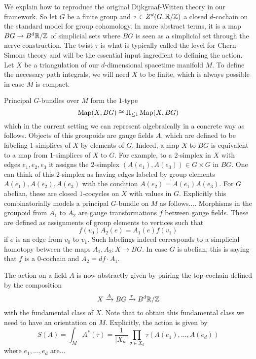 \begin{example}
\end{example}

\begin{example}
We explain how to reproduce the original Dijkgraaf-Witten theory in our framework.
So let $G$ be a finite group and $\tau \in Z^d(G, \mathbb{R}/ \mathbb{Z})$ a closed $d$-cochain on the standard model for group cohomology.
In more abstract terms, it is a map $BG \to B^{d} \mathbb{R}/\mathbb{Z}$ of simplicial sets where $BG$ is seen as a simplicial set through the nerve construction.
The twist $\tau$ is what is typically called the level for Chern-Simons theory and will be the essential input ingredient to defining the action.
Let $X$ be a triangulation of our $d$-dimensional spacetime manifold $M$.
To define the necessary path integrals, we will need $X$ to be finite, which is always possible in case $M$ is compact.

Principal $G$-bundles over $M$ form the $1$-type
\[
\operatorname{Map}(X, BG) \cong \Pi_{\leq 1} \operatorname{Map}(X, BG)
\]
which in the current setting we can represent algebraically in a concrete way as follows.
Objects of this groupoids are gauge fields $A$, which are defined to be labeling $1$-simplices of $X$ by elements of $G$.
Indeed, a map $X$ to $BG$ is equivalent to a map from $1$-simplices of $X$ to $G$.
For example, to a $2$-simplex in $X$ with edges $e_1, e_2, e_3$ it assigns the $2$-simplex $(A(e_1), A(e_3)) \in G \times G$ in $BG$.
One can think of this $2$-simplex as having edges labeled by group elements $A(e_1), A(e_2), A(e_3)$ with the condition $A(e_2) = A(e_1) A(e_3)$. 
For $G$ abelian, these are closed $1$-cocycles on $X$ with values in $G$.
Explicitly this combinatorially models a principal $G$-bundle on $M$ as follows....
Morphisms in the groupoid from $A_1$ to $A_2$ are gauge transformations $f$ between gauge fields.
These are defined as assignments of group elements to vertices such that 
\[
f(v_0) A_2(e) = A_1(e) f(v_1)
\]
if $e$ is an edge from $v_0$ to $v_1$.
Such labelings indeed corresponds to a simplicial homotopy between the maps $A_1, A_2: X \to BG$.
In case $G$ is abelian, this is saying that $f$ is a $0$-cochain and $A_2 = df \cdot A_1$.

The action on a field $A$ is now abstractly given by pairing the top cochain defined by the composition
\[
X \xrightarrow{A} BG \xrightarrow{\tau} B^d \mathbb{R} / \mathbb{Z}
\]
with the fundamental class of $X$.
Note that to obtain this fundamental class we need to have an orientation on $M$.
Explicitly, the action is given by
\[
S(A) = \int_M A^*(\tau) = \frac{1}{|X_n|} \prod_{\sigma \in X_d} \tau(A(e_1), \dots, A(e_d))
\]
where $e_1, \dots, e_d$ are... 


\end{example}
